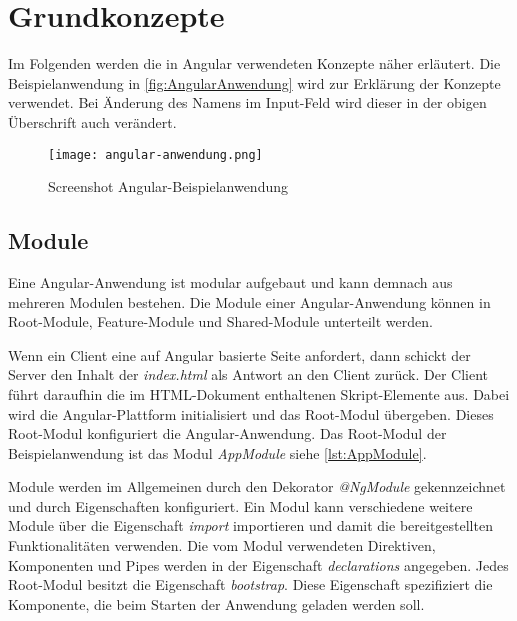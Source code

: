 \section{Grundkonzepte}



Im Folgenden werden die in Angular verwendeten Konzepte näher erläutert. Die Beispielanwendung in \autoref{fig:AngularAnwendung} wird zur Erklärung der Konzepte verwendet. Bei Änderung des Namens im Input-Feld wird dieser in der obigen Überschrift auch verändert.

\begin{figure}
	\centering
	\texttt{[image: angular-anwendung.png]}
	\caption{Screenshot Angular-Beispielanwendung} 
	\label{fig:AngularAnwendung}
\end{figure}



\subsection{Module}

Eine Angular-Anwendung ist modular aufgebaut und kann demnach aus mehreren Modulen bestehen. \autocites[vgl.][103\psqq]{Steyer.2017} Die Module einer Angular-Anwendung können in Root-Module, Feature-Module und Shared-Module unterteilt werden. 

Wenn ein Client eine auf Angular basierte Seite anfordert, dann schickt der Server den Inhalt der \textit{index.html} als Antwort an den Client zurück. Der Client führt daraufhin die im HTML-Dokument enthaltenen Skript-Elemente aus. Dabei wird die Angular-Plattform initialisiert und das Root-Modul übergeben. Dieses Root-Modul konfiguriert die Angular-Anwendung.\autocites[vgl.][60]{Steyer.2017}[vgl.][226\psqq]{Freeman.2018}  Das Root-Modul der Beispielanwendung ist das Modul \textit{AppModule} siehe \autoref{lst:AppModule}. 

Module werden im Allgemeinen durch den Dekorator \textit{@NgModule} gekennzeichnet und durch Eigenschaften konfiguriert. Ein Modul kann verschiedene weitere Module über die Eigenschaft \textit{import} importieren und damit die bereitgestellten Funktionalitäten verwenden. Die vom Modul verwendeten Direktiven, Komponenten und Pipes werden in der Eigenschaft \textit{declarations} angegeben. Jedes Root-Modul besitzt die Eigenschaft \textit{bootstrap}. Diese Eigenschaft spezifiziert die Komponente, die beim Starten der Anwendung geladen werden soll. 

